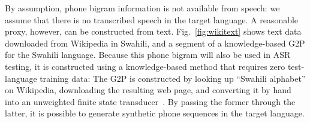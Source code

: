 By assumption, phone bigram information is not available from speech:
we assume that there is no transcribed speech in the target language.
A reasonable proxy, however, can be constructed from text.
Fig.~\ref{fig:wikitext} shows text data downloaded from Wikipedia in
Swahili, and a segment of a knowledge-based G2P for the Swahili
language.  {\color{blue} Because this phone bigram will also be used
  in ASR testing, it is constructed using a knowledge-based method
  that requires zero test-language training data: The G2P is
  constructed by looking up ``Swahili alphabet'' on Wikipedia,
  downloading the resulting web page, and converting it by hand into
  an unweighted finite state transducer~\cite{Hasegawajohnson15}.}  By
passing the former through the latter, it is possible to generate
synthetic phone sequences in the target language.

